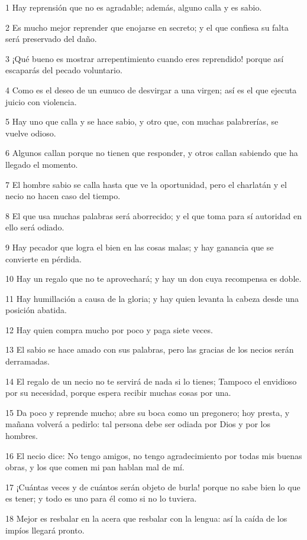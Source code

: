 \par 1 Hay reprensión que no es agradable; además, alguno calla y es sabio.
\par 2 Es mucho mejor reprender que enojarse en secreto; y el que confiesa su falta será preservado del daño.
\par 3 ¡Qué bueno es mostrar arrepentimiento cuando eres reprendido! porque así escaparás del pecado voluntario.
\par 4 Como es el deseo de un eunuco de desvirgar a una virgen; así es el que ejecuta juicio con violencia.
\par 5 Hay uno que calla y se hace sabio, y otro que, con muchas palabrerías, se vuelve odioso.
\par 6 Algunos callan porque no tienen que responder, y otros callan sabiendo que ha llegado el momento.
\par 7 El hombre sabio se calla hasta que ve la oportunidad, pero el charlatán y el necio no hacen caso del tiempo.
\par 8 El que usa muchas palabras será aborrecido; y el que toma para sí autoridad en ello será odiado.
\par 9 Hay pecador que logra el bien en las cosas malas; y hay ganancia que se convierte en pérdida.
\par 10 Hay un regalo que no te aprovechará; y hay un don cuya recompensa es doble.
\par 11 Hay humillación a causa de la gloria; y hay quien levanta la cabeza desde una posición abatida.
\par 12 Hay quien compra mucho por poco y paga siete veces.
\par 13 El sabio se hace amado con sus palabras, pero las gracias de los necios serán derramadas.
\par 14 El regalo de un necio no te servirá de nada si lo tienes; Tampoco el envidioso por su necesidad, porque espera recibir muchas cosas por una.
\par 15 Da poco y reprende mucho; abre su boca como un pregonero; hoy presta, y mañana volverá a pedirlo: tal persona debe ser odiada por Dios y por los hombres.
\par 16 El necio dice: No tengo amigos, no tengo agradecimiento por todas mis buenas obras, y los que comen mi pan hablan mal de mí.
\par 17 ¡Cuántas veces y de cuántos serán objeto de burla! porque no sabe bien lo que es tener; y todo es uno para él como si no lo tuviera.
\par 18 Mejor es resbalar en la acera que resbalar con la lengua: así la caída de los impíos llegará pronto.
